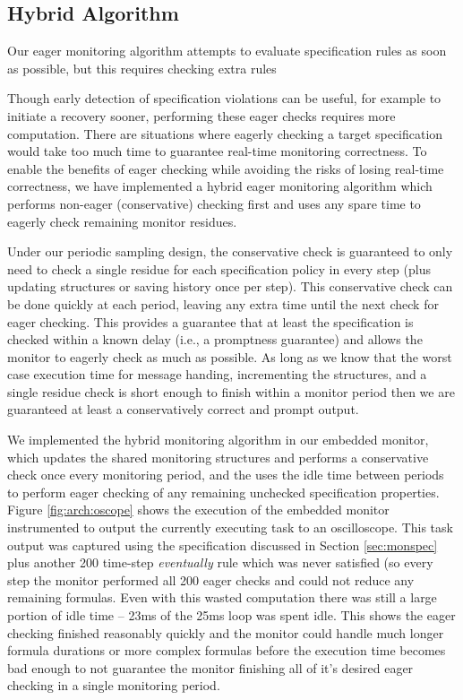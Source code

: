 \subsection{Hybrid Algorithm}
Our eager monitoring algorithm attempts to evaluate specification rules as soon as possible, but this requires checking extra rules


Though early detection of specification violations can be useful, for example to initiate a recovery sooner, performing these eager checks requires more computation.
%
There are situations where eagerly checking a target specification would take too much time to guarantee real-time monitoring correctness. To enable the benefits of eager checking while avoiding the risks of losing real-time correctness, we have implemented a hybrid eager monitoring algorithm which performs non-eager (conservative) checking first and uses any spare time to eagerly check remaining monitor residues.

Under our periodic sampling design, the conservative check is guaranteed to only need to check a single residue for each specification policy in every step (plus updating structures or saving history once per step). 
This conservative check can be done quickly at each period, leaving any extra time until the next check for eager checking. This provides a guarantee that at least the specification is checked within a known delay (i.e., a promptness guarantee) and allows the monitor to eagerly check as much as possible. 
As long as we know that the worst case execution time for message handing, incrementing the structures, and a single residue check is short enough to finish within a monitor period then we are guaranteed at least a conservatively correct and prompt output.

We implemented the hybrid monitoring algorithm in our embedded monitor, which updates the shared monitoring structures and performs a conservative check once every monitoring period, and the uses the idle time between periods to perform eager checking of any remaining unchecked specification properties.
%
Figure \ref{fig:arch:oscope} shows the execution of the embedded monitor instrumented to output the currently executing task to an oscilloscope. This task output was captured using the specification discussed in Section \ref{sec:monspec} plus another 200 time-step \emph{eventually} rule which was never satisfied (so every step the monitor performed all 200 eager checks and could not reduce any remaining formulas. Even with this wasted computation there was still a large portion of idle time -- 23ms of the 25ms loop was spent idle. This shows the eager checking finished reasonably quickly and the monitor could handle much longer formula durations or more complex formulas before the execution time becomes bad enough to not guarantee the monitor finishing all of it's desired eager checking in a single monitoring period. 

